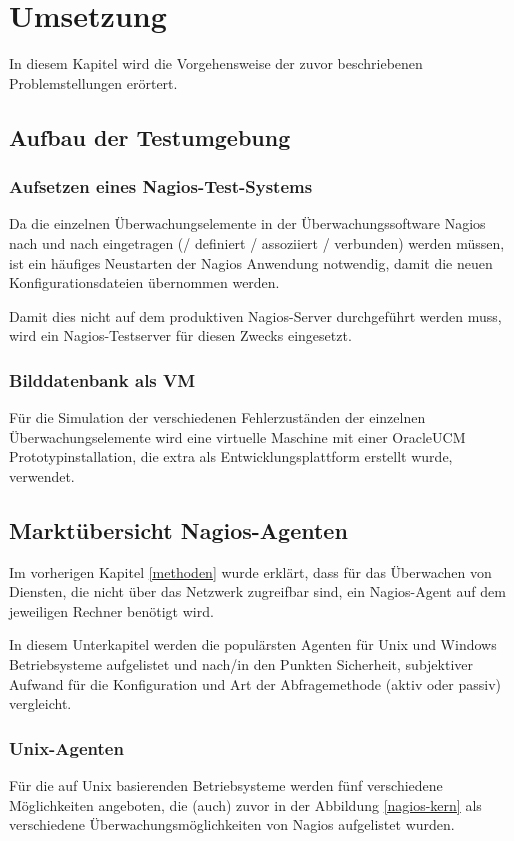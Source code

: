\section{Umsetzung}
In diesem Kapitel wird die Vorgehensweise der zuvor beschriebenen Problemstellungen erörtert.

\subsection{Aufbau der Testumgebung}




\subsubsection{Aufsetzen eines Nagios-Test-Systems}
Da die einzelnen Überwachungselemente in der Überwachungssoftware Nagios nach und nach eingetragen (/ definiert / assoziiert / verbunden) werden müssen, ist ein häufiges Neustarten der Nagios Anwendung notwendig, damit die neuen Konfigurationsdateien übernommen werden.

Damit dies nicht auf dem produktiven Nagios-Server durchgeführt werden muss, wird ein Nagios-Testserver für diesen Zwecks eingesetzt.

\subsubsection{Bilddatenbank als VM}
Für die Simulation der verschiedenen Fehlerzuständen der einzelnen Überwachungselemente wird eine virtuelle Maschine mit einer \gls{OracleUCM} Prototypinstallation, die extra als Entwicklungsplattform erstellt wurde, verwendet.


\subsection{Marktübersicht Nagios-Agenten}
Im vorherigen Kapitel \ref{methoden} wurde erklärt, dass für das Überwachen von Diensten, die nicht über das Netzwerk zugreifbar sind, ein Nagios-Agent auf dem jeweiligen Rechner benötigt wird.

In diesem Unterkapitel werden die populärsten Agenten für Unix und Windows Betriebsysteme aufgelistet und nach/in den Punkten Sicherheit, subjektiver Aufwand für die Konfiguration und Art der Abfragemethode (aktiv oder passiv) vergleicht.
\newpage
\subsubsection{Unix-Agenten}
Für die auf Unix basierenden Betriebsysteme werden fünf verschiedene Möglichkeiten angeboten, die (auch) zuvor in der Abbildung \ref{nagios-kern} als verschiedene Überwachungsmöglichkeiten von Nagios aufgelistet wurden.

